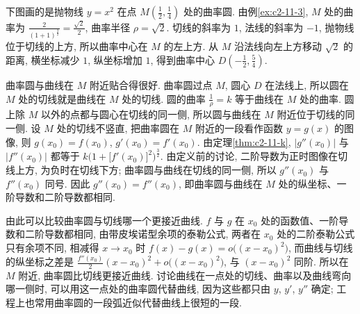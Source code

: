 \documentclass[UTF8,openany]{ctexbook}
\theoremstyle{chinesetextbook}
\begin{document}
下图画的是抛物线 $y=x^2$ 在点 $\displaystyle M\left(\frac12,\frac14\right)$ 处的曲率圆. 由例\ref{ex:c2-11-3}, $M$ 处的曲率为 $\displaystyle\frac2{(1+1)^{\frac32}}=\frac{\sqrt2}2$, 曲率半径 $\rho=\sqrt2$. 切线的斜率为 $1$, 法线的斜率为 $-1$, 抛物线位于切线的上方, 所以曲率中心在 $M$ 的左上方. 从 $M$ 沿法线向左上方移动 $\sqrt2$ 的距离, 横坐标减少 $1$, 纵坐标增加 $1$, 得到曲率中心 $\displaystyle D\left(-\frac12,\frac54\right)$.
\begin{center}
\end{center}

曲率圆与曲线在 $M$ 附近贴合得很好. 曲率圆过点 $M$, 圆心 $D$ 在法线上, 所以圆在 $M$ 处的切线就是曲线在 $M$ 处的切线. 圆的曲率 $\displaystyle\frac1\rho=k$ 等于曲线在 $M$ 处的曲率. 圆上除 $M$ 以外的点都与圆心在切线的同一侧, 所以圆与曲线在 $M$ 附近位于切线的同一侧. 设 $M$ 处的切线不竖直, 把曲率圆在 $M$ 附近的一段看作函数 $y=g(x)$ 的图像, 则 $g(x_0)=f(x_0)$, $g'(x_0)=f'(x_0)$. 由定理\ref{thm:c2-11-k}, $|g''(x_0)|$ 与 $|f''(x_0)|$ 都等于 $k\bigl(1+\bigl[f'(x_0)\bigr]^2\bigr)^{\frac32}$. 由定义前的讨论, 二阶导数为正时图像在切线上方, 为负时在切线下方; 曲率圆与曲线在切线的同一侧, 所以 $g''(x_0)$ 与 $f''(x_0)$ 同号. 因此 $g''(x_0)=f''(x_0)$, 即曲率圆与曲线在 $M$ 处的纵坐标、一阶导数和二阶导数都相同.

由此可以比较曲率圆与切线哪一个更接近曲线. $f$ 与 $g$ 在 $x_0$ 处的函数值、一阶导数和二阶导数都相同, 由带皮埃诺型余项的泰勒公式, 两者在 $x_0$ 处的二阶泰勒公式只有余项不同, 相减得 $x\to x_0$ 时 $f(x)-g(x)=o\bigl((x-x_0)^2\bigr)$, 而曲线与切线的纵坐标之差是 $\displaystyle\frac{f''(x_0)}2(x-x_0)^2+o\bigl((x-x_0)^2\bigr)$, 与 $(x-x_0)^2$ 同阶. 所以在 $M$ 附近, 曲率圆比切线更接近曲线. 讨论曲线在一点处的切线、曲率以及曲线弯向哪一侧时, 可以用这一点处的曲率圆代替曲线, 因为这些都只由 $y$, $y'$, $y''$ 确定; 工程上也常用曲率圆的一段弧近似代替曲线上很短的一段.
\end{document}

